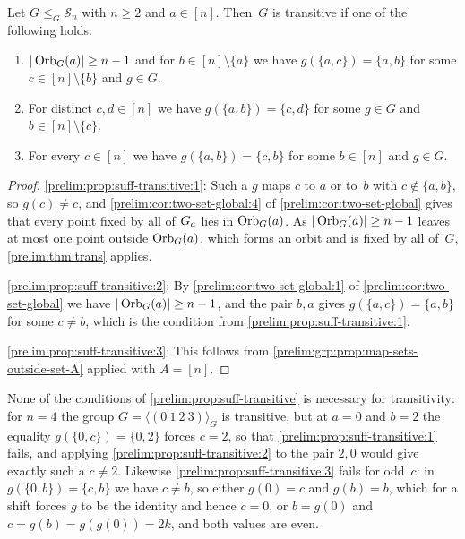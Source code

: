 \begin{proposition} \label{prelim:prop:suff-transitive}  
	\label{prelim:lem:2sets-and-botha-transitive} %
	 \label{prelim:lem:2sets-transitive2} %
	Let $G \le_G \mathcal S_n$ with $n \ge 2$ and $a \in [n]$.
	Then~$G$ is transitive if one of the following holds:
	\begin{enumerate}
		\item \label{prelim:prop:suff-transitive:1} $|\Orbit{a}{G}| \ge n - 1$ and for
		$b \in [n] \setminus \{a\}$ we have $g(\{a,c\}) = \{a,b\}$ for some
		$c \in [n] \setminus \{b\}$ and $g \in G$.
		
		\item \label{prelim:prop:suff-transitive:2} For distinct $c,d \in [n]$ we have
		$g(\{a,b\}) = \{c,d\}$ for some $g \in G$ and $b \in [n] \setminus \{c\}$.
		
		\item \label{prelim:prop:suff-transitive:3} For every $c \in [n]$ we have
		$g(\{a,b\}) = \{c,b\}$ for some $b \in [n]$ and $g \in G$.
	\end{enumerate}
\end{proposition}
\begin{proof}
	\ref{prelim:prop:suff-transitive:1}: Such a $g$ maps $c$ to $a$ or to~$b$ with
	$c \notin \{a,b\}$, so $g(c) \ne c$, and
	\cref{prelim:cor:two-set-global:4} of \cref{prelim:cor:two-set-global} gives that every point
	fixed by all of $\Stab{a}{G}$ lies in $\Orbit{a}{G}$.
	As $|\Orbit{a}{G}| \ge n - 1$ leaves at most one point outside $\Orbit{a}{G}$, which forms an
	orbit and is fixed by all of~$G$, \cref{prelim:thm:trans} applies.
	
\ref{prelim:prop:suff-transitive:2}: By
\cref{prelim:cor:two-set-global:1} of \cref{prelim:cor:two-set-global} we have
$|\Orbit{a}{G}| \ge n - 1$, and the pair $b,a$ gives $g(\{a,c\}) = \{a,b\}$
for some $c \ne b$,	which is the condition from \cref{prelim:prop:suff-transitive:1}.
	
	\ref{prelim:prop:suff-transitive:3}: This follows from \cref{prelim:grp:prop:map-sets-outside-set-A} applied with $A = [n]$.
\end{proof}

\begin{remark}
	None of the conditions of \cref{prelim:prop:suff-transitive} is necessary for transitivity:
	for $n = 4$ the group $G = \langle (0~1~2~3) \rangle_G$ is transitive, but at $a = 0$ and
	$b = 2$ the equality $g(\{0,c\}) = \{0,2\}$ forces $c = 2$, so that
	\cref{prelim:prop:suff-transitive:1} fails, and applying
	\cref{prelim:prop:suff-transitive:2} to the pair $2,0$ would give exactly such a $c \ne 2$.
	Likewise \cref{prelim:prop:suff-transitive:3} fails for odd~$c$: in $g(\{0,b\}) = \{c,b\}$ we
	have $c \ne b$, so either $g(0) = c$ and $g(b) = b$, which for a shift forces $g$ to be the
	identity and hence $c = 0$, or $b = g(0)$ and $c = g(b) = g(g(0)) = 2k$, and both values are
	even.
\end{remark}

